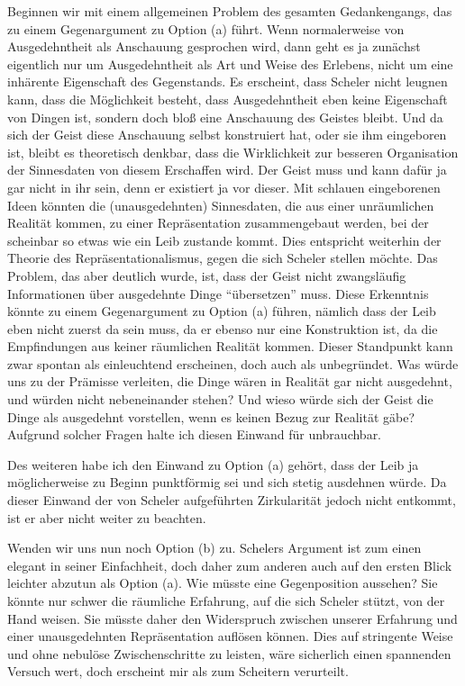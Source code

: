 \documentclass[a4paper, 12pt]{article}
\begin{document}
\begin{onehalfspace}
Beginnen wir mit einem allgemeinen Problem des gesamten Gedankengangs, das zu einem Gegenargument zu Option (a) führt. Wenn normalerweise von Ausgedehntheit als Anschauung gesprochen wird, dann geht es ja zunächst eigentlich nur um Ausgedehntheit als Art und Weise des Erlebens, nicht um eine inhärente Eigenschaft des Gegenstands. Es erscheint, dass Scheler nicht leugnen kann, dass die Möglichkeit besteht, dass Ausgedehntheit eben keine Eigenschaft von Dingen ist, sondern doch bloß eine Anschauung des Geistes bleibt. Und da sich der Geist diese Anschauung selbst konstruiert hat, oder sie ihm eingeboren ist, bleibt es theoretisch denkbar, dass die Wirklichkeit zur besseren Organisation der Sinnesdaten von diesem Erschaffen wird. Der Geist muss und kann dafür ja gar nicht in ihr sein, denn er existiert ja vor dieser. Mit schlauen eingeborenen Ideen könnten die (unausgedehnten) Sinnesdaten, die aus einer unräumlichen Realität kommen, zu einer Repräsentation zusammengebaut werden, bei der scheinbar so etwas wie ein Leib zustande kommt. Dies entspricht weiterhin der Theorie des Repräsentationalismus, gegen die sich Scheler stellen möchte. Das Problem, das aber deutlich wurde, ist, dass der Geist nicht zwangsläufig Informationen über ausgedehnte Dinge "`übersetzen"' muss. Diese Erkenntnis könnte zu einem Gegenargument zu Option (a) führen, nämlich dass der Leib eben nicht zuerst da sein muss, da er ebenso nur eine Konstruktion ist, da die Empfindungen aus keiner räumlichen Realität kommen. Dieser Standpunkt kann zwar spontan als einleuchtend erscheinen, doch auch als unbegründet. Was würde uns zu der Prämisse verleiten, die Dinge wären in Realität gar nicht ausgedehnt, und würden nicht nebeneinander stehen? Und wieso würde sich der Geist die Dinge als ausgedehnt vorstellen, wenn es keinen Bezug zur Realität gäbe? Aufgrund solcher Fragen halte ich diesen Einwand für unbrauchbar.

Des weiteren habe ich den Einwand zu Option (a) gehört, dass der Leib ja möglicherweise zu Beginn punktförmig sei und sich stetig ausdehnen würde. Da dieser Einwand der von Scheler aufgeführten Zirkularität jedoch nicht entkommt, ist er aber nicht weiter zu beachten.

Wenden wir uns nun noch Option (b) zu. Schelers Argument ist zum einen elegant in seiner Einfachheit, doch daher zum anderen auch auf den ersten Blick leichter abzutun als Option (a). Wie müsste eine Gegenposition aussehen? Sie könnte nur schwer die räumliche Erfahrung, auf die sich Scheler stützt, von der Hand weisen. Sie müsste daher den Widerspruch zwischen unserer Erfahrung und einer unausgedehnten Repräsentation auflösen können. Dies auf stringente Weise und ohne nebulöse Zwischenschritte zu leisten, wäre sicherlich einen spannenden Versuch wert, doch erscheint mir als zum Scheitern verurteilt.  


\end{onehalfspace}
\end{document}
